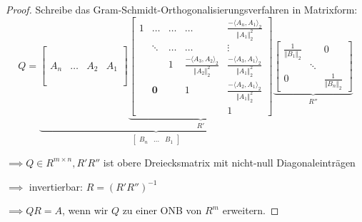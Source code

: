 \documentclass{book}
\begin{document}
            \begin{proof}
                Schreibe das Gram-Schmidt-Orthogonalisierungsverfahren in Matrixform:
                \[
                Q=\underbrace{\begin{bmatrix}
                    &&&\\
                    &&&\\
                    &&&\\
                    A_n & \dots & A_2 & A_1\\
                    &&&\\
                    &&&\\
                    &&&
                \end{bmatrix}
                \underbrace{
                \begin{bmatrix}
                    1 & \dots  & \dots & \dots & \frac{-\langle A_n,A_1 \rangle_2}{\Vert A_1 \Vert_2^2}\\
                    & \ddots & \dots & \dots & \vdots \\
                    &        & 1 & \frac{-\langle A_3,A_2 \rangle_2}{\Vert A_2 \Vert_2^2} & \frac{-\langle A_3,A_1 \rangle_2}{\Vert A_1 \Vert_2^2}\\
                    & \textbf{0} &  & 1 & \frac{-\langle A_2,A_1 \rangle_2}{\Vert A_1 \Vert_2^2} \\
                    & & &  & 1
                \end{bmatrix}}_{R'}}_{\begin{bmatrix}
                    B_n & \dots &  B_1
                \end{bmatrix}} 
                \underbrace{
                \begin{bmatrix}
                    \frac{1}{\Vert B_1 \Vert_2} & & 0\\
                    & \ddots& \\
                    0 & &  \frac{1}{\Vert B_n \Vert_2}
                \end{bmatrix}}_{R''}
                \]

                $\implies Q\in R^{m\times n},R'R''$ ist obere Dreiecksmatrix mit nicht-null Diagonaleinträgen

                $\implies$ invertierbar: $R=(R'R'')^{-1}$
                
                $\implies QR=A$, wenn wir $Q$ zu einer ONB von $R^m$ erweitern.
            \end{proof}
        
\end{document}
